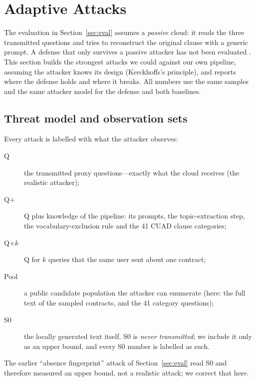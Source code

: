 \newcommand{\XX}[1]{\textcolor{red}{[#1]}}

\section{Adaptive Attacks}
\label{sec:adaptive}

The evaluation in Section~\ref{sec:eval} assumes a \emph{passive} cloud: it reads the three transmitted questions and tries to reconstruct the original clause with a generic prompt. A defense that only survives a passive attacker has not been evaluated \cite{carlini2019evaluating,tramer2020adaptive}. This section builds the strongest attacks we could against our own pipeline, assuming the attacker knows its design (Kerckhoffs's principle), and reports where the defense holds and where it breaks. All numbers use the same samples and the same attacker model for the defense and both baselines.

\subsection{Threat model and observation sets}
\label{sec:adaptive:threat}

Every attack is labelled with what the attacker observes:
\begin{description}
  \item[Q] the transmitted proxy questions---exactly what the cloud receives (the realistic attacker);
  \item[Q+] Q plus knowledge of the pipeline: its prompts, the topic-extraction step, the vocabulary-exclusion rule and the 41 CUAD clause categories;
  \item[Q$\times k$] Q for $k$ queries that the same user sent about one contract;
  \item[Pool] a public candidate population the attacker can enumerate (here: the full text of the sampled contracts, and the 41 category questions);
  \item[S0] the locally generated text itself. S0 is \emph{never transmitted}; we include it only as an upper bound, and every S0 number is labelled as such.
\end{description}
The earlier ``absence fingerprint'' attack of Section~\ref{sec:eval} read S0 and therefore measured an upper bound, not a realistic attack; we correct that here.


